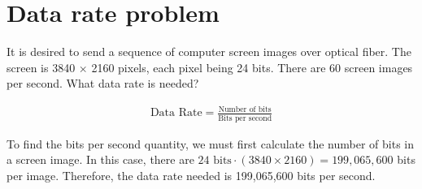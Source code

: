 
\section{Data rate problem}
It is desired to send a sequence of computer screen images over optical fiber. The screen is 3840 $\times$ 2160 pixels, each pixel being 24 bits. There are 60 screen images per second. What data rate is needed?

\begin{align*}
	\text{Data Rate} = \frac{\text{Number of bits}}{\text{Bits per second}}
\end{align*}

To find the bits per second quantity, we must first calculate the number of bits in a screen image. In this case, there are $24 \text{ bits} \cdot (3840 \times 2160) = 199,065,600$ bits per image. Therefore, the data rate needed is 199,065,600 bits per second.

\section{}
\section{}
\section{}
\section{}
\section{}
\section{}
